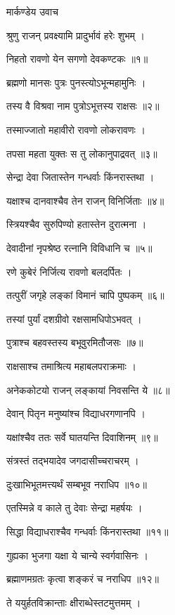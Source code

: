 
\vakta{}
\shrota{}
\notes{}

\storymeta


मार्कण्डेय उवाच

श्रुणु राजन् प्रवक्ष्यामि प्रादुर्भावं हरेः शुभम् ।

निहतो रावणो येन सगणो देवकण्टकः ॥१॥

ब्रह्मणो मानसः पुत्रः पुनस्त्योऽभून्महामुनिः ।

तस्य वै विश्रवा नाम पुत्रोऽभूत्तस्य राक्षसः ॥२॥

तस्माज्जातो महावीरो रावणो लोकरावणः ।

तपसा महता युक्तः स तु लोकानुपाद्रवत् ॥३॥

सेन्द्रा देवा जितास्तेन गन्धर्वाः किंनरास्तथा ।

यक्षाश्च दानवाश्चैव तेन राजन् विनिर्जिताः ॥४॥

स्त्रियश्चैव सुरुपिण्यो हतास्तेन दुरात्मना ।

देवादीनां नृपश्रेष्ठ रत्नानि विविधानि च ॥५॥

रणे कुबेरं निर्जित्य रावणो बलदर्पितः ।

तत्पुरीं जगृहे लङ्कां विमानं चापि पुष्पकम् ॥६॥

तस्यां पुर्यां दशग्रीवो रक्षसामधिपोऽभवत् ।

पुत्राश्च बहवस्तस्य बभूवुरमितौजसः ॥७॥

राक्षसाश्च तमाश्रित्य महाबलपराक्रमाः ।

अनेककोटयो राजन् लङ्कायां निवसन्ति ये ॥८॥

देवान् पितृन मनुष्यांश्च विद्याधरगणानपि ।

यक्षांश्चैव ततः सर्वे घातयन्ति दिवाशिनम् ॥९॥

संत्रस्तं तद्भयादेव जगदासीच्चराचरम् ।

दुःखाभिभूतमत्त्यर्थं सम्बभूव नराधिप ॥१०॥

एतस्मिन्ने व काले तु देवाः सेन्द्रा महर्षयः ।

सिद्धा विद्याधराश्चैव गन्धर्वाः किंनरास्तथा ॥११॥

गुह्यका भुजगा यक्षा ये चान्ये स्वर्गवासिनः ।

ब्रह्माणमग्रतः कृत्वा शङ्करं च नराधिप ॥१२॥

ते ययुर्हतविक्रान्ताः क्षीराब्धेस्तटमुत्तमम् ।

